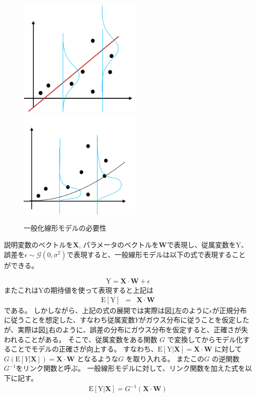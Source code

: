 \begin{figure}[hbtp]
        \includegraphics[width=6cm]{asset/glm1.png}~~~~~ ~~~~~ 
        \includegraphics[width=6cm]{asset/glm2.png}
            \caption{一般化線形モデルの必要性}
            \label{glm}
\end{figure}

説明変数のベクトルを$ \mathbf{X} $, パラメータのベクトルを$ \mathbf{W} $で表現し、従属変数を$ \mathrm{Y} $、誤差を$ \epsilon \sim \mathcal{G}(0, \sigma^2) $で表現すると、一般線形モデルは以下の式で表現することができる。

\begin{eqnarray}
\mathrm{Y}= \mathbf{X} \cdot  \mathbf{W} + \epsilon
\label{eq:senkei}
\end{eqnarray}
またこれは$ \mathrm{Y}$の期待値を使って表現すると上記は
\begin{eqnarray}
    \mathrm{E}[\mathrm{Y}] &=& \mathbf{X} \cdot  \mathbf{W}
\label{eq:link}
\end{eqnarray}
である。
しかしながら、上記の式の展開では実際は図\ref{glm}左のように$ \epsilon $が正規分布に従うことを想定した、すなわち従属変数$ Y $がガウス分布に従うことを仮定したが、実際は図\ref{glm}右のように、誤差の分布にガウス分布を仮定すると、正確さが失われることがある。
そこで、従属変数をある関数 $ G $ で変換してからモデル化することでモデルの正確さが向上する。
すなわち、$ \mathrm{E}[\mathrm{Y}|\mathbf{X}] = \mathbf{X} \cdot  \mathbf{W} $ に対して$ G(\mathrm{E}[Y|\mathbf{X}]) = \mathbf{X} \cdot  \mathbf{W} $ となるような$ G $ を取り入れる。
またこの$ G $ の逆関数 $ G^{-1} $をリンク関数と呼ぶ。
一般線形モデルに対して、リンク関数を加えた式を以下に記す。
\begin{eqnarray}
\mathrm{E}[\mathrm{Y}|\mathbf{X}]=G^{-1} (\mathbf{X}\cdot  \mathbf{W})
\label{eq:link}
\end{eqnarray}

